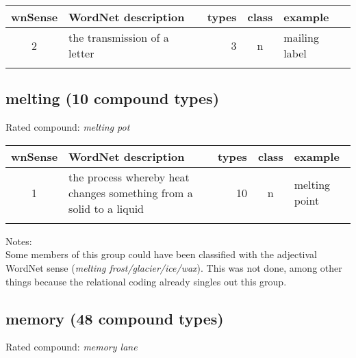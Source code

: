 \noindent
\begin{longtable}{c>{\raggedright\arraybackslash}p{5cm}rc>{\raggedright\arraybackslash}p{2cm}}\lsptoprule
{\small wnSense}&WordNet description&types&class&example\\\midrule
2&the transmission of a letter&3&n&mailing label\\\lspbottomrule
\end{longtable}

\subsection{melting      (10 compound types)}
Rated compound: \emph{melting pot}

\vspace*{1ex}

\noindent
\begin{longtable}{c>{\raggedright\arraybackslash}p{5cm}rc>{\raggedright\arraybackslash}p{2cm}}\lsptoprule
{\small wnSense}&WordNet description&types&class&example\\\midrule
1&the process whereby heat changes something from a solid to a liquid&10&n&melting point\\\lspbottomrule
\end{longtable}

\noindent
Notes:\\
Some members of this group could have been classified with the
adjectival WordNet sense (\emph{melting
  frost/glacier/ice/wax}). This was not done, among other things
because the relational coding already singles out this group.
\subsection{memory       (48 compound types)}
Rated compound: \emph{memory lane}

\vspace*{1ex}

